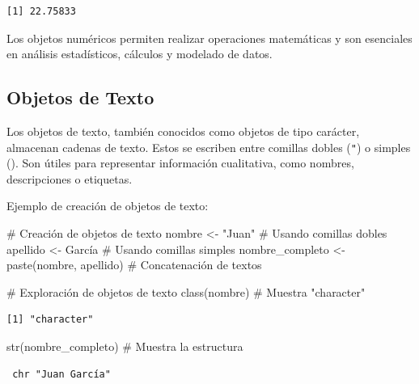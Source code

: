 \documentclass[
  spanish,
  a4paper,
  DIV=11,
  numbers=noendperiod,
  onepage,
  openany]{scrreprt}
\newenvironment{Shaded}{\begin{snugshade}}{\end{snugshade}}
\newcommand{\CommentTok}[1]{\textcolor[rgb]{0.37,0.37,0.37}{#1}}
\newcommand{\FunctionTok}[1]{\textcolor[rgb]{0.28,0.35,0.67}{#1}}
\newcommand{\NormalTok}[1]{\textcolor[rgb]{0.00,0.23,0.31}{#1}}
\newcommand{\OtherTok}[1]{\textcolor[rgb]{0.00,0.23,0.31}{#1}}
\newcommand{\StringTok}[1]{\textcolor[rgb]{0.13,0.47,0.30}{#1}}
\begin{document}
\begin{verbatim}
[1] 22.75833
\end{verbatim}

Los objetos numéricos permiten realizar operaciones matemáticas y son
esenciales en análisis estadísticos, cálculos y modelado de datos.

\subsection{Objetos de Texto}\label{objetos-de-texto}

Los objetos de texto, también conocidos como objetos de tipo carácter,
almacenan cadenas de texto. Estos se escriben entre comillas dobles
(\texttt{"}) o simples (\texttt{\textquotesingle{}}). Son útiles para
representar información cualitativa, como nombres, descripciones o
etiquetas.

Ejemplo de creación de objetos de texto:

\begin{Shaded}
\begin{Highlighting}[]
\CommentTok{\# Creación de objetos de texto}
\NormalTok{nombre }\OtherTok{\textless{}{-}} \StringTok{"Juan"}           \CommentTok{\# Usando comillas dobles}
\NormalTok{apellido }\OtherTok{\textless{}{-}} \StringTok{\textquotesingle{}García\textquotesingle{}}       \CommentTok{\# Usando comillas simples}
\NormalTok{nombre\_completo }\OtherTok{\textless{}{-}} \FunctionTok{paste}\NormalTok{(nombre, apellido)  }\CommentTok{\# Concatenación de textos}

\CommentTok{\# Exploración de objetos de texto}
\FunctionTok{class}\NormalTok{(nombre)          }\CommentTok{\# Muestra "character"}
\end{Highlighting}
\end{Shaded}

\begin{verbatim}
[1] "character"
\end{verbatim}

\begin{Shaded}
\begin{Highlighting}[]
\FunctionTok{str}\NormalTok{(nombre\_completo)   }\CommentTok{\# Muestra la estructura}
\end{Highlighting}
\end{Shaded}

\begin{verbatim}
 chr "Juan García"
\end{verbatim}
\end{document}
